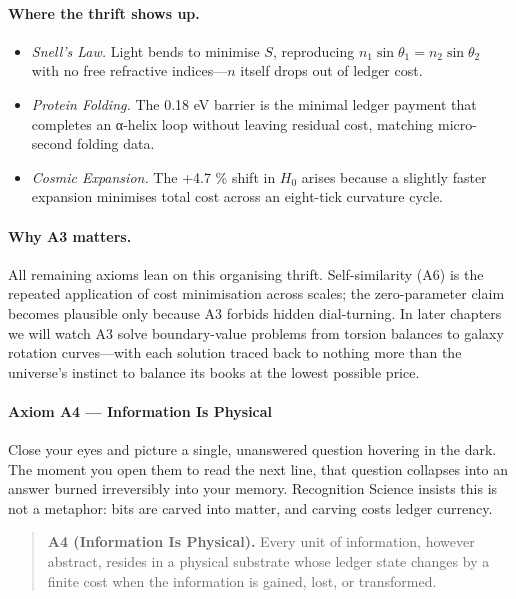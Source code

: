 \documentclass[11pt,oneside]{book}
\begin{document}
\paragraph*{Where the thrift shows up.}
\begin{itemize}
\item \emph{Snell’s Law.}  
  Light bends to minimise \(S\), reproducing \(n_1\sin\theta_1=n_2\sin\theta_2\)
  with no free refractive indices—\(n\) itself drops out of ledger cost.
\item \emph{Protein Folding.}  
  The 0.18 eV barrier is the minimal ledger payment that completes an
  α-helix loop without leaving residual cost, matching micro-second
  folding data.
\item \emph{Cosmic Expansion.}  
  The +4.7 \% shift in \(H_0\) arises because a slightly faster expansion
  minimises total cost across an eight-tick curvature cycle.
\end{itemize}

\paragraph*{Why A3 matters.}
All remaining axioms lean on this organising thrift.  Self-similarity
(A6) is the repeated application of cost minimisation across scales; the
zero-parameter claim becomes plausible only because A3 forbids hidden
dial-turning.  In later chapters we will watch A3 solve boundary-value
problems from torsion balances to galaxy rotation curves—with each
solution traced back to nothing more than the universe’s instinct to
balance its books at the lowest possible price.

\paragraph{Axiom A4 — Information Is Physical}
\label{ssec:axiom-A4}

Close your eyes and picture a single, unanswered question hovering in
the dark.  The moment you open them to read the next line, that question
collapses into an answer burned irreversibly into your memory.  
Recognition Science insists this is not a metaphor: bits are carved into
matter, and carving costs ledger currency.  

\begin{quote}
\textbf{A4 (Information Is Physical).}  
Every unit of information, however abstract, resides in a physical
substrate whose ledger state changes by a finite cost when the
information is gained, lost, or transformed.
\end{quote}
\end{document}
